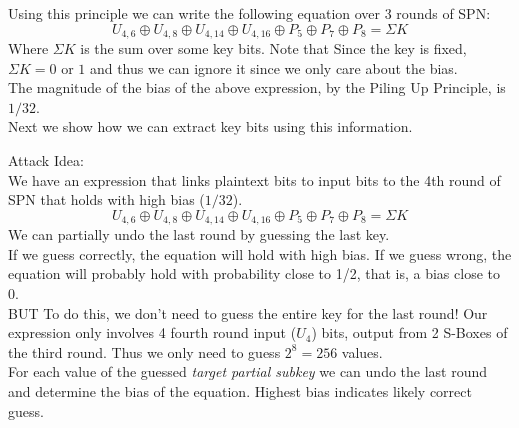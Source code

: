 \documentclass[9pt]{beamer}
\begin{document}
\begin{frame}
Using this principle we can write the following equation over 3 rounds of SPN:
\[ U_{4,6} \oplus U_{4,8} \oplus U_{4,14} \oplus U_{4, 16} \oplus P_5 \oplus P_7 \oplus P_8 = \Sigma K \]
\pause Where $\Sigma K$ is the sum over some key bits. Note that Since the key is fixed, $\Sigma K = 0$ or $1$ and thus we can ignore it since we only care about the bias.\\
\vspace{5mm}
\pause The magnitude of the bias of the above expression, by the Piling Up Principle, is $1/32$. \\
\vspace{5mm}
\pause Next we show how we can extract key bits using this information.
\end{frame}

\begin{frame}
Attack Idea:\\
\vspace{3mm}
We have an expression that links plaintext bits to input bits to the 4th round of SPN that holds with high bias ($1/32$). 
\[ U_{4,6} \oplus U_{4,8} \oplus U_{4,14} \oplus U_{4, 16} \oplus P_5 \oplus P_7 \oplus P_8 = \Sigma K \]
\pause We can partially undo the last round by guessing the last key. \\
\vspace{3mm}
\pause
If we guess correctly, the equation will hold with high bias. If we guess wrong, the equation will probably hold with probability close to 1/2, that is, a bias close to 0.\\
\vspace{3mm}
\pause
BUT To do this, we don't need to guess the entire key for the last round! \pause Our expression only involves 4 fourth round input ($U_4$) bits, output from 2 S-Boxes of the third round. Thus we only need to guess $2^8 = 256$ values.\\
\vspace{3mm}
\pause
For each value of the guessed \textit{target partial subkey} we can undo the last round and determine the bias of the equation. Highest bias indicates likely correct guess.
\end{frame}
\end{document}

